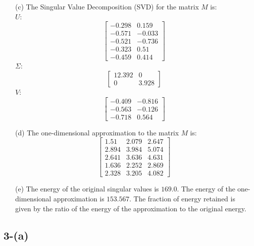 \documentclass{article}
\begin{document}
\begin{enumerate}
    \item[(c)] The Singular Value Decomposition (SVD) for the matrix \( M \) is:\\
    \( U \):
    \[
    \begin{bmatrix}
        -0.298 & 0.159 \\
        -0.571 & -0.033 \\
        -0.521 & -0.736 \\
        -0.323 & 0.51 \\
        -0.459 & 0.414
    \end{bmatrix}
    \]
    \( \Sigma \):
    \[
    \begin{bmatrix}
        12.392 & 0 \\
        0 & 3.928
    \end{bmatrix}
    \]
    \( V \):
    \[
    \begin{bmatrix}
        -0.409 & -0.816 \\
        -0.563 & -0.126 \\
        -0.718 & 0.564
    \end{bmatrix}
    \]

    \item[(d)] The one-dimensional approximation to the matrix \( M \) is:
    \[
    \begin{bmatrix}
        1.51 & 2.079 & 2.647 \\
        2.894 & 3.984 & 5.074 \\
        2.641 & 3.636 & 4.631 \\
        1.636 & 2.252 & 2.869 \\
        2.328 & 3.205 & 4.082
    \end{bmatrix}
    \]

    \item[(e)] The energy of the original singular values is \( 169.0 \). The energy of the one-dimensional approximation is \( 153.567 \). The fraction of energy retained is given by the ratio of the energy of the approximation to the original energy.
\end{enumerate}

\subsection*{3-(a)}
\end{document}
